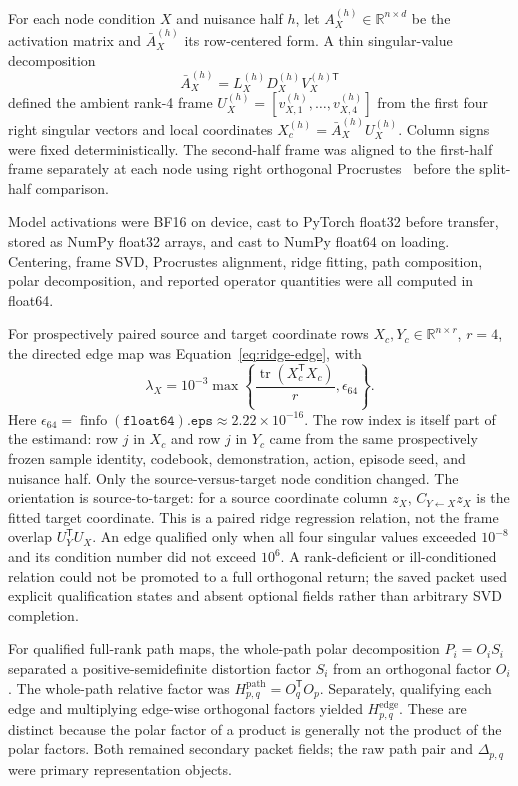 \documentclass[10pt,a4paper]{article}
\begin{document}
For each node condition $X$ and nuisance half $h$, let $A_X^{(h)}\in\mathbb R^{n\times d}$ be the activation matrix and $\bar A_X^{(h)}$ its row-centered form. A thin singular-value decomposition
\begin{equation}
 \bar A_X^{(h)}=L_X^{(h)}D_X^{(h)}V_X^{(h)\mathsf T}
\end{equation}
defined the ambient rank-4 frame $U_X^{(h)}=[v_{X,1}^{(h)},\ldots,v_{X,4}^{(h)}]$ from the first four right singular vectors and local coordinates $X_c^{(h)}=\bar A_X^{(h)}U_X^{(h)}$. Column signs were fixed deterministically. The second-half frame was aligned to the first-half frame separately at each node using right orthogonal Procrustes~\cite{schonemann1966} before the split-half comparison.

Model activations were BF16 on device, cast to PyTorch float32 before transfer, stored as NumPy float32 arrays, and cast to NumPy float64 on loading. Centering, frame SVD, Procrustes alignment, ridge fitting, path composition, polar decomposition, and reported operator quantities were all computed in float64.

For prospectively paired source and target coordinate rows $X_c,Y_c\in\mathbb R^{n\times r}$, $r=4$, the directed edge map was Equation~\eqref{eq:ridge-edge}, with
\begin{equation}
 \lambda_X=10^{-3}\max\!\left\{
 \frac{\operatorname{tr}(X_c^{\mathsf T}X_c)}{r},\epsilon_{64}
 \right\}.
 \label{eq:ridge-lambda}
\end{equation}
Here $\epsilon_{64}=\operatorname{finfo}(\texttt{float64}).\texttt{eps}\approx2.22\times10^{-16}$.
The row index is itself part of the estimand: row $j$ in $X_c$ and row $j$ in $Y_c$ came from the same prospectively frozen sample identity, codebook, demonstration, action, episode seed, and nuisance half. Only the source-versus-target node condition changed. The orientation is source-to-target: for a source coordinate column $z_X$, $C_{Y\leftarrow X}z_X$ is the fitted target coordinate. This is a paired ridge regression relation, not the frame overlap $U_Y^{\mathsf T}U_X$. An edge qualified only when all four singular values exceeded $10^{-8}$ and its condition number did not exceed $10^6$. A rank-deficient or ill-conditioned relation could not be promoted to a full orthogonal return; the saved packet used explicit qualification states and absent optional fields rather than arbitrary SVD completion.

For qualified full-rank path maps, the whole-path polar decomposition $P_i=O_iS_i$ separated a positive-semidefinite distortion factor $S_i$ from an orthogonal factor $O_i$. The whole-path relative factor was $H^{\mathrm{path}}_{p,q}=O_q^{\mathsf T}O_p$. Separately, qualifying each edge and multiplying edge-wise orthogonal factors yielded $H^{\mathrm{edge}}_{p,q}$. These are distinct because the polar factor of a product is generally not the product of the polar factors. Both remained secondary packet fields; the raw path pair and $\Delta_{p,q}$ were primary representation objects.
\end{document}
